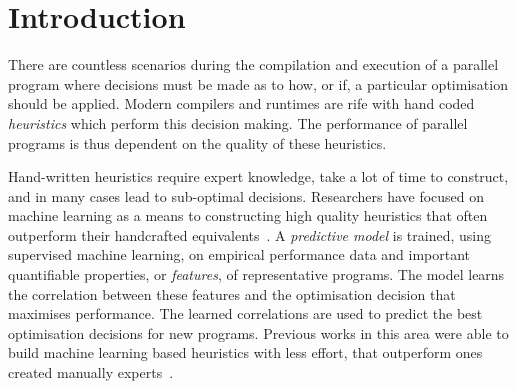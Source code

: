 \section{Introduction}

%
%
%

There are countless scenarios during the compilation and execution of a parallel program where decisions must be made as to how, or if, a particular optimisation should be applied. Modern compilers and runtimes are rife with hand coded \emph{heuristics} which perform this decision making. The performance of parallel programs is thus dependent on the quality of these heuristics.

Hand-written heuristics require expert knowledge, take a lot of time to construct, and in many cases lead to sub-optimal decisions. Researchers have focused on machine learning as a means to constructing high quality heuristics that often outperform their handcrafted equivalents~\cite{Micolet2016,Falch2015,Stephenson2005,Agakov,Cummins2015a}. A \emph{predictive model} is trained, using supervised machine learning, on empirical performance data and important quantifiable properties, or \emph{features}, of representative programs. The model learns the correlation between these features and the optimisation decision that maximises performance. The learned correlations are used to predict the best optimisation decisions for new programs. Previous works in this area were able to build machine learning based heuristics with less effort, that outperform ones created manually experts~\cite{Grewe2013,Magni2014}.

